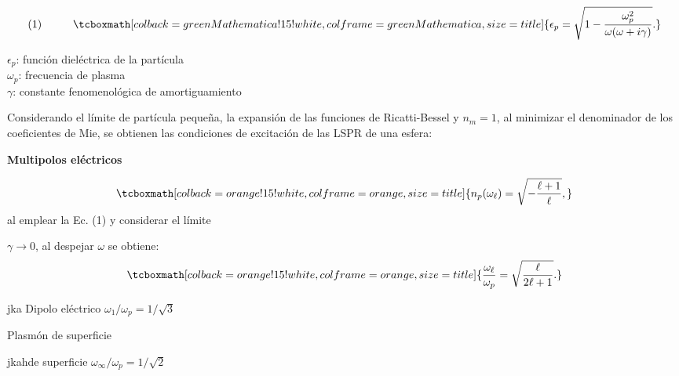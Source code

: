 \documentclass[a0paper,portrait]{baposter}
\begin{document}
\begin{poster}
{			\begin{minipage}[c]{0.45\textwidth}
				$$\text{(1)}\hspace{1cm} \tcboxmath[colback=greenMathematica!15!white ,colframe=greenMathematica,size=title]{\epsilon_p =\sqrt{1-\frac{\omega_p^2}{\omega(\omega+i\gamma)}}.}$$
			\end{minipage}
				\begin{minipage}[c]{0.55\textwidth}
				$\epsilon_p$: función dieléctrica de la partícula\\
				$\omega_p$: frecuencia de plasma\\
				$\gamma$: constante fenomenológica de amortiguamiento
			\end{minipage}			
			
			
			\vspace{0.2cm}
			Considerando el límite de partícula pequeña, la expansión de las funciones de Ricatti-Bessel \cite{Abramowitz} y $n_m=1$, al minimizar el denominador de los coeficientes de Mie, se obtienen las condiciones de excitación de las LSPR de una esfera:\\
			
		
			\begin{minipage}[c]{.55\linewidth}
				\centerline{ {\color{orange}\textbf{Multipolos eléctricos} } }
				
				\vspace{-0.1cm}
				$$\tcboxmath[colback=orange!15!white ,colframe=orange,size=title]{n_p(\omega_\ell)=\sqrt{-\frac{\ell+1}{\ell}},}$$
				al emplear la Ec. (1) y considerar el límite 
				
				$\gamma\rightarrow0$, al despejar $\omega$ se obtiene: 
				$$\tcboxmath[colback=orange!15!white ,colframe=orange,size=title]{\frac{\omega_\ell}{\omega_p}=\sqrt{\frac{\ell}{2\ell+1}}.}$$
				
				 {\color{white}jka}{\scriptsize{\color{orange} Dipolo eléctrico} }\hspace{1.1cm} $\omega_1/\omega_p=1/\sqrt{3}$
			
				 {\scriptsize{\color{orange} Plasmón de superficie} }
				 
				 {\color{white}jkah}{\scriptsize\color{orange}de superficie} \hspace{1.17cm} $\omega_{\infty}/\omega_p=1/\sqrt{2}$	
			\end{minipage}
			}
\end{poster}
\end{document}
